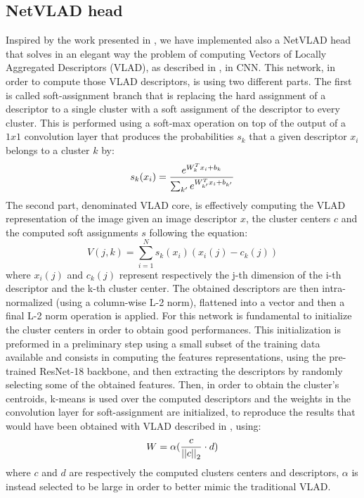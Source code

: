 \documentclass[10pt,twocolumn,letterpaper]{article}
\begin{document}
\subsection{NetVLAD head}\label{sec:NETVLAD}
Inspired by the work presented in \cite{NETVLAD}, we have implemented also a NetVLAD head that solves in an 
elegant way the problem of computing Vectors of Locally Aggregated Descriptors (VLAD), as described in \cite{VLAD},
in CNN. This network, in order to compute those VLAD descriptors, is using two different parts. 
The first is called soft-assignment branch that is replacing the hard assignment of a descriptor to a single cluster
with a soft assignment of the descriptor to every cluster. This is performed using a soft-max operation on top of the output of a $1x1$
 convolution layer that produces the probabilities $s_k$ that a given descriptor $x_i$ belongs to a cluster $k$ by:
 \begin{equation}
    s_k(x_i) = {{e^{W_k^T x_i+b_k}}\over{\sum_{k'} e^{W_{k'}^T x_i+b_{k'}}}}
 \end{equation} 
The second part, denominated VLAD core, is effectively computing the 
VLAD representation of the image given an image descriptor $x$, the cluster centers $c$ and the computed soft assignments
$s$ following the equation:
\begin{equation}
   V(j,k) = \sum_{i=1}^N s_k(x_i) (x_i(j) - c_k(j))
\end{equation} 
where $x_i(j)$ and $c_k(j)$ represent respectively the j-th dimension of the i-th descriptor and the k-th cluster center.
The obtained descriptors are then intra-normalized (using a column-wise L-2 norm), flattened into a vector and then a
final L-2 norm operation is applied.
For this network is fundamental to initialize the cluster centers in order to obtain good performances. This initialization
is preformed in a preliminary step using a small subset of the training data available and consists in computing the features 
representations, using the pre-trained ResNet-18 backbone, and then extracting the descriptors by randomly selecting some of the 
obtained features. Then, in order to obtain the cluster's centroids, k-means is used over the computed descriptors and the 
weights in the convolution layer for soft-assignment are initialized, to reproduce the results that would have been obtained
with VLAD described in \cite{VLAD}, using:
\begin{equation}
   W = \alpha ({{c}\over{{||c||}_2}} \cdot d )
\end{equation}
where $c$ and $d$ are respectively the computed clusters centers and descriptors, $\alpha$ is instead selected to be large
in order to better mimic the traditional VLAD.
\end{document}
